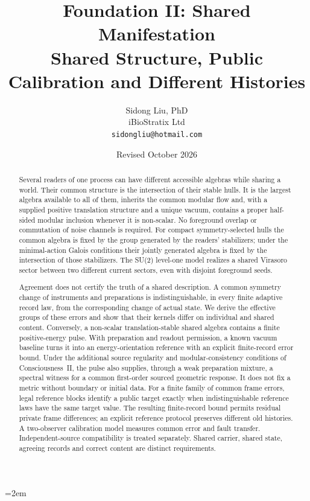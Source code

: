 \documentclass[12pt]{article}
\title{%
  \textbf{Foundation II: Shared Manifestation}\\
  \textbf{Shared Structure, Public Calibration and Different Histories}%
}
\author{
  Sidong Liu, PhD \\
  \small iBioStratix Ltd \\
  \small \texttt{sidongliu@hotmail.com}
}
\date{Revised October 2026}
\theoremstyle{definition}
\theoremstyle{remark}
\begin{document}
\emergencystretch=2em
\raggedbottom
{}

\maketitle

\begin{abstract}
Several readers of one process can have different accessible algebras while
sharing a world. Their common structure is the intersection of their stable
hulls. It is the largest algebra available to all of them, inherits the common
modular flow and, with a supplied positive translation structure and a unique
vacuum, contains a proper half-sided modular inclusion whenever it is
non-scalar. No foreground overlap or commutation of noise channels is required.
For compact symmetry-selected hulls the common algebra is fixed by the group
generated by the readers' stabilizers; under the minimal-action Galois
conditions their jointly generated algebra is fixed by the intersection of
those stabilizers. The SU(2) level-one model realizes a shared Virasoro sector
between two different current sectors, even with disjoint foreground seeds.

Agreement does not certify the truth of a shared description. A common symmetry
change of instruments and preparations is indistinguishable, in every finite
adaptive record law, from the corresponding change of actual state. We derive
the effective groups of these errors and show that their kernels differ on
individual and shared content. Conversely, a non-scalar translation-stable
shared algebra contains a finite positive-energy pulse. With preparation and
readout permission, a known vacuum baseline turns it into an energy-orientation
reference with an explicit finite-record error bound. Under the additional
source regularity and modular-consistency conditions of Consciousness~II, the
pulse also supplies, through a weak preparation mixture, a spectral witness
for a common first-order sourced geometric response.
It does not fix a metric without boundary or initial data. For a finite
family of common frame errors, legal reference blocks identify a public target
exactly when indistinguishable reference laws have the same target value.
The resulting finite-record bound permits residual private frame differences;
an explicit reference protocol preserves different old histories. A
two-observer calibration model measures common error and fault transfer.
Independent-source compatibility is treated separately. Shared carrier,
shared state, agreeing records and correct content are distinct requirements.
\end{abstract}
\end{document}
